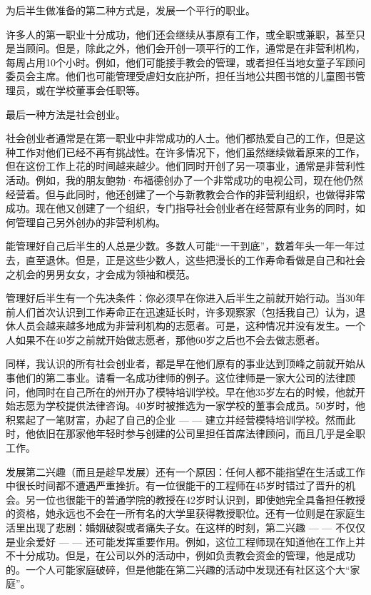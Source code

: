 \documentclass[a4paper,12pt,lang=cn,fontset = windows]{elegantpaper} %
\begin{document}
为后半生做准备的第二种方式是，发展一个平行的职业。

许多人的第一职业十分成功，他们还会继续从事原有工作，或全职或兼职，甚至只是当顾问。但是，除此之外，他们会开创一项平行的工作，通常是在非营利机构，每周占用10个小时。例如，他们可能接手教会的管理，或者担任当地女童子军顾问委员会主席。他们也可能管理受虐妇女庇护所，担任当地公共图书馆的儿童图书管理员，或在学校董事会任职等。

最后一种方法是社会创业。

社会创业者通常是在第一职业中非常成功的人士。他们都热爱自己的工作，但是这种工作对他们已经不再有挑战性。在许多情况下，他们虽然继续做着原来的工作，但在这份工作上花的时间越来越少。他们同时开创了另一项事业，通常是非营利性活动。例如，我的朋友鲍勃·布福德创办了一个非常成功的电视公司，现在他仍然经营着。但与此同时，他还创建了一个与新教教会合作的非营利组织，也做得非常成功。现在他又创建了一个组织，专门指导社会创业者在经营原有业务的同时，如何管理自己另外创办的非营利机构。

能管理好自己后半生的人总是少数。多数人可能“一干到底”，数着年头一年一年过去，直至退休。但是，正是这些少数人，这些把漫长的工作寿命看做是自己和社会之机会的男男女女，才会成为领袖和模范。

管理好后半生有一个先决条件：你必须早在你进入后半生之前就开始行动。当30年前人们首次认识到工作寿命正在迅速延长时，许多观察家（包括我自己）认为，退休人员会越来越多地成为非营利机构的志愿者。可是，这种情况并没有发生。一个人如果不在40岁之前就开始做志愿者，那他60岁之后也不会去做志愿者。

同样，我认识的所有社会创业者，都是早在他们原有的事业达到顶峰之前就开始从事他们的第二事业。请看一名成功律师的例子。这位律师是一家大公司的法律顾问，他同时在自己所在的州开办了模特培训学校。早在他35岁左右的时候，他就开始志愿为学校提供法律咨询。40岁时被推选为一家学校的董事会成员。50岁时，他积累起了一笔财富，办起了自己的企业 — — 建立并经营模特培训学校。然而此时，他依旧在那家他年轻时参与创建的公司里担任首席法律顾问，而且几乎是全职工作。

发展第二兴趣（而且是趁早发展）还有一个原因：任何人都不能指望在生活或工作中很长时间都不遭遇严重挫折。有一位很能干的工程师在45岁时错过了晋升的机会。另一位也很能干的普通学院的教授在42岁时认识到，即使她完全具备担任教授的资格，她永远也不会在一所有名的大学里获得教授职位。还有一位则是在家庭生活里出现了悲剧：婚姻破裂或者痛失子女。在这样的时刻，第二兴趣 — — 不仅仅是业余爱好 — — 还可能发挥重要作用。例如，这位工程师现在知道他在工作上并不十分成功。但是，在公司以外的活动中，例如负责教会资金的管理，他是成功的。一个人可能家庭破碎，但是他能在第二兴趣的活动中发现还有社区这个大“家庭”。
\end{document}
